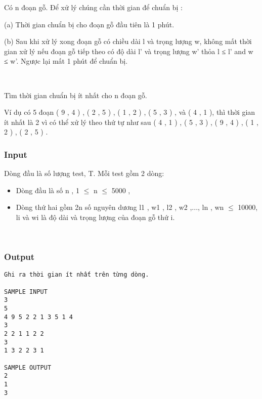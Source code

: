 

Có n đoạn gỗ. Để xử lý chúng cần thời gian để chuẩn bị :

(a) Thời gian chuẩn bị cho đoạn gỗ đầu tiên là 1 phút.

(b) Sau khi xử lý xong đoạn gỗ có chiều dài l và trọng lượng w, không mất thời gian xử lý nếu đoạn gỗ tiếp theo có độ dài l' và trọng lượng w' thỏa l ≤ l' and w ≤ w'. Ngược lại mất 1 phút để chuẩn bị.

 

Tìm thời gian chuẩn bị ít nhất cho n đoạn gỗ.

Ví dụ có 5 đoạn ( 9 , 4 ) , ( 2 , 5 ) , ( 1 , 2 ) , ( 5 , 3 ) , và ( 4 , 1 ), thì thời gian ít nhất là 2 vì có thể xử lý theo thứ tự như sau ( 4 , 1 ) , ( 5 , 3 ) , ( 9 , 4 ) , ( 1 , 2 ) , ( 2 , 5 ) .

\subsubsection{Input}

Dòng đầu là số lượng test, T. Mỗi test gồm 2 dòng:
\begin{itemize}
	\item Dòng đầu là số n , 1  $\le$  n  $\le$  5000 ,
	\item Dòng thứ hai gồm 2n số nguyên dương l1 , w1 , l2 , w2 ,..., ln , wn  $\le$  10000, li và wi là độ dài và trọng lượng của đoạn gỗ thứ i. 
\end{itemize}

 

\subsubsection{Output}
\begin{verbatim}
Ghi ra thời gian ít nhất trên từng dòng.
​
SAMPLE INPUT
3 
5 
4 9 5 2 2 1 3 5 1 4 
3 
2 2 1 1 2 2 
3 
1 3 2 2 3 1

SAMPLE OUTPUT
2
1
3\end{verbatim}
